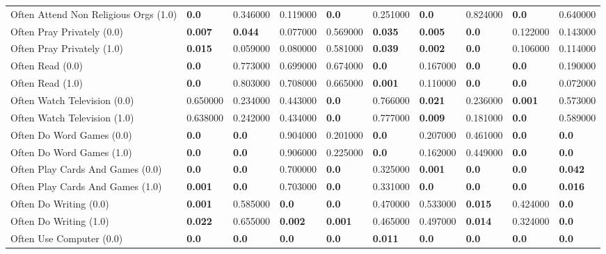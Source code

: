 \begin{tabular}{llllllllll}
Often Attend Non Religious Orgs (1.0) & \textbf{0.0} & 0.346000 & 0.119000 & \textbf{0.0} & 0.251000 & \textbf{0.0} & 0.824000 & \textbf{0.0} & 0.640000 \\
Often Pray Privately (0.0) & \textbf{0.007} & \textbf{0.044} & 0.077000 & 0.569000 & \textbf{0.035} & \textbf{0.005} & \textbf{0.0} & 0.122000 & 0.143000 \\
Often Pray Privately (1.0) & \textbf{0.015} & 0.059000 & 0.080000 & 0.581000 & \textbf{0.039} & \textbf{0.002} & \textbf{0.0} & 0.106000 & 0.114000 \\
Often Read (0.0) & \textbf{0.0} & 0.773000 & 0.699000 & 0.674000 & \textbf{0.0} & 0.167000 & \textbf{0.0} & \textbf{0.0} & 0.190000 \\
Often Read (1.0) & \textbf{0.0} & 0.803000 & 0.708000 & 0.665000 & \textbf{0.001} & 0.110000 & \textbf{0.0} & \textbf{0.0} & 0.072000 \\
Often Watch Television (0.0) & 0.650000 & 0.234000 & 0.443000 & \textbf{0.0} & 0.766000 & \textbf{0.021} & 0.236000 & \textbf{0.001} & 0.573000 \\
Often Watch Television (1.0) & 0.638000 & 0.242000 & 0.434000 & \textbf{0.0} & 0.777000 & \textbf{0.009} & 0.181000 & \textbf{0.0} & 0.589000 \\
Often Do Word Games (0.0) & \textbf{0.0} & \textbf{0.0} & 0.904000 & 0.201000 & \textbf{0.0} & 0.207000 & 0.461000 & \textbf{0.0} & \textbf{0.0} \\
Often Do Word Games (1.0) & \textbf{0.0} & \textbf{0.0} & 0.906000 & 0.225000 & \textbf{0.0} & 0.162000 & 0.449000 & \textbf{0.0} & \textbf{0.0} \\
Often Play Cards And Games (0.0) & \textbf{0.0} & \textbf{0.0} & 0.700000 & \textbf{0.0} & 0.325000 & \textbf{0.001} & \textbf{0.0} & \textbf{0.0} & \textbf{0.042} \\
Often Play Cards And Games (1.0) & \textbf{0.001} & \textbf{0.0} & 0.703000 & \textbf{0.0} & 0.331000 & \textbf{0.0} & \textbf{0.0} & \textbf{0.0} & \textbf{0.016} \\
Often Do Writing (0.0) & \textbf{0.001} & 0.585000 & \textbf{0.0} & \textbf{0.0} & 0.470000 & 0.533000 & \textbf{0.015} & 0.424000 & \textbf{0.0} \\
Often Do Writing (1.0) & \textbf{0.022} & 0.655000 & \textbf{0.002} & \textbf{0.001} & 0.465000 & 0.497000 & \textbf{0.014} & 0.324000 & \textbf{0.0} \\
Often Use Computer (0.0) & \textbf{0.0} & \textbf{0.0} & \textbf{0.0} & \textbf{0.0} & \textbf{0.011} & \textbf{0.0} & \textbf{0.0} & \textbf{0.0} & \textbf{0.0} \\

\end{tabular}
